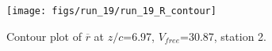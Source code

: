 \begin{figure}[H]
\centering
\texttt{[image: figs/run\_19/run\_19\_R\_contour]}
\caption{Contour plot of $\overline{r}$ at $z/c$=6.97, $V_{free}$=30.87, station 2.}
\label{fig:run_19_R_contour}
\end{figure}


